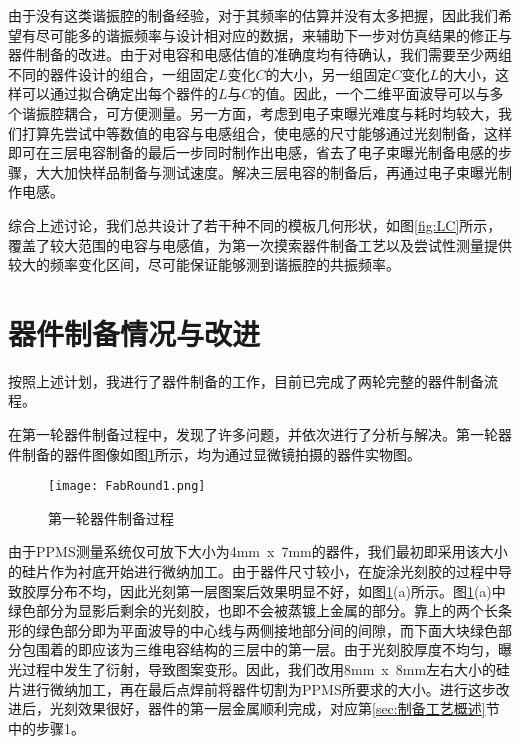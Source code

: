             由于没有这类谐振腔的制备经验，对于其频率的估算并没有太多把握，因此我们希望有尽可能多的谐振频率与设计相对应的数据，来辅助下一步对仿真结果的修正与器件制备的改进。由于对电容和电感估值的准确度均有待确认，我们需要至少两组不同的器件设计的组合，一组固定$L$变化$C$的大小，另一组固定$C$变化$L$的大小，这样可以通过拟合确定出每个器件的$L$与$C$的值。因此，一个二维平面波导可以与多个谐振腔耦合，可方便测量。另一方面，考虑到电子束曝光难度与耗时均较大，我们打算先尝试中等数值的电容与电感组合，使电感的尺寸能够通过光刻制备，这样即可在三层电容制备的最后一步同时制作出电感，省去了电子束曝光制备电感的步骤，大大加快样品制备与测试速度。解决三层电容的制备后，再通过电子束曝光制作电感。

            综合上述讨论，我们总共设计了若干种不同的模板几何形状，如图\ref{fig:LC}所示，覆盖了较大范围的电容与电感值，为第一次摸索器件制备工艺以及尝试性测量提供较大的频率变化区间，尽可能保证能够测到谐振腔的共振频率。





            \section{器件制备情况与改进} %
            \label{sec:器件制备情况与改进}
                按照上述计划，我进行了器件制备的工作，目前已完成了两轮完整的器件制备流程。

                在第一轮器件制备过程中，发现了许多问题，并依次进行了分析与解决。第一轮器件制备的器件图像如图\ref{fig:FabRound1}所示，均为通过显微镜拍摄的器件实物图。

            \begin{figure}[h]
                \centering
                \texttt{[image: FabRound1.png]}
                \caption{第一轮器件制备过程}
                \label{fig:FabRound1}
            \end{figure}

            由于PPMS测量系统仅可放下大小为4mm~x~7mm的器件，我们最初即采用该大小的硅片作为衬底开始进行微纳加工。由于器件尺寸较小，在旋涂光刻胶的过程中导致胶厚分布不均，因此光刻第一层图案后效果明显不好，如图\ref{fig:FabRound1}(a)所示。图\ref{fig:FabRound1}(a)中绿色部分为显影后剩余的光刻胶，也即不会被蒸镀上金属的部分。靠上的两个长条形的绿色部分即为平面波导的中心线与两侧接地部分间的间隙，而下面大块绿色部分包围着的即应该为三维电容结构的三层中的第一层。由于光刻胶厚度不均匀，曝光过程中发生了衍射，导致图案变形。因此，我们改用8mm~x~8mm左右大小的硅片进行微纳加工，再在最后点焊前将器件切割为PPMS所要求的大小。进行这步改进后，光刻效果很好，器件的第一层金属顺利完成，对应第\ref{sec:制备工艺概述}节中的步骤1。

